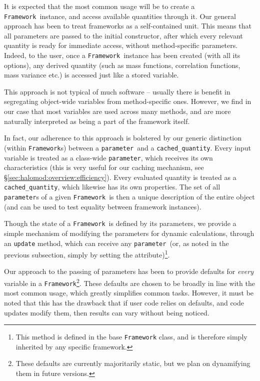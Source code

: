 \documentclass[5p,aas_macros]{elsarticle}
\newcommand{\framework}{\texttt{Framework}}
\newcommand{\parameter}{\texttt{parameter}}
\newcommand{\cached}{\texttt{cached\_quantity}}
\begin{document}
It is expected that the most common usage will be to create a \framework\ instance, and access available quantities through it. Our general approach has been to treat frameworks as a self-contained unit. This means that all parameters are passed to the initial constructor, after which every relevant quantity is ready for immediate access, without method-specific parameters. Indeed, to the user, once a \framework\ instance has been created (with all its options), any derived quantity (such as mass functions, correlation functions, mass variance etc.) is accessed just like a stored variable. 

This approach is not typical of much software -- usually there is benefit in segregating object-wide variables from method-specific ones. However, we find in our case that most variables are used across many methods, and are more naturally interpreted as being a part of the framework itself. 

In fact, our adherence to this approach is bolstered by our generic distinction (within \texttt{Framework}s) between a \parameter\ and a \cached. Every input variable is treated as a class-wide \parameter, which receives its own characteristics (this is very useful for our caching mechanism, see \S\ref{sec:halomod:overview:efficiency}). Every evaluated quantity is treated as a \cached, which likewise has its own properties. The set of all \texttt{parameter}s of a given \framework\ is then a unique description of the entire object (and can be used to test equality between framework instances). 

Though the state of a \framework\ is defined by its parameters, we provide a simple mechanism of modifying the parameters for dynamic calculations, through an \verb|update| method, which can receive any \parameter\ (or, as noted in the previous subsection, simply by setting the attribute)\footnote{This method is defined in the base \texttt{Framework} class, and is therefore simply inherited by any specific framework.}.

Our approach to the passing of parameters has been to provide defaults for \textit{every} variable in a \framework\footnote{These defaults are currently majoritarily static, but we plan on dynamifying them in future versions.}. These defaults are chosen to be broadly in line with the most common usage, which greatly simplifies common tasks. However, it must be noted that this has the drawback that if user code relies on defaults, and code updates modify them, then results can vary without being noticed. 
\end{document}
